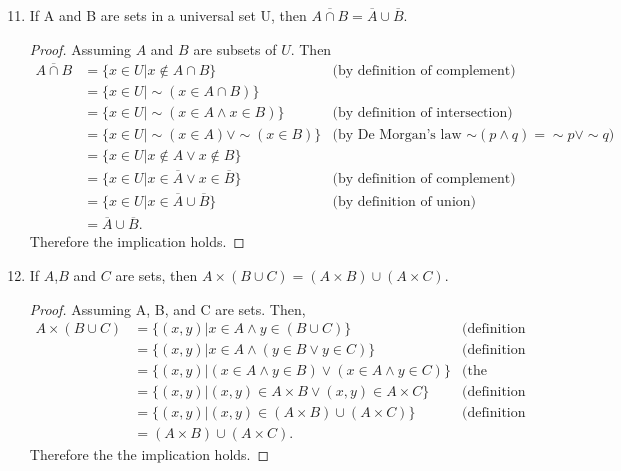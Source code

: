\documentclass{article}
\newcommand{\nitem}[1] %
{
	\setcounter{enumi}{#1}
	\addtocounter{enumi}{-1}
	\item
}
\begin{document}
\begin{enumerate}
		\nitem{10} If A and B are sets in a universal set U, then $\overline{A \cap B}= \overline{A} \cup \overline{B}$.
		\begin{proof} Assuming $A$ and $B$ are subsets of $U$. Then
			\begin{align*}
				\overline{A \cap B} &= \{x \in U| x \not\in A \cap B\} 
				& \text{(by definition of complement) } \\
				&= \{x \in U| \sim(x \in A \cap B)\} \\
				&= \{x \in U| \sim(x \in A \wedge x \in B)\} 
				& \text{(by definition of intersection)}\\
				&= \{x \in U| \sim(x \in A) \vee \sim(x \in B)\} 
				& \text{(by De Morgan's law $\sim(p \wedge q)= \sim p \vee \sim q$)} \\
				&= \{x \in U| x \not\in A \vee x \not\in B\}		\\
				&= \{x \in U| x \in \overline{A} \vee x \in \overline{B}\} 
				& \text{(by definition of complement) } \\
				&= \{x \in U| x \in \overline{A} \cup \overline{B}\} 
				& \text{(by definition of union)}\\
				&=\overline{A} \cup \overline{B}.
			\end{align*}
			Therefore the implication holds.  
		\end{proof}
		
		\nitem{16} If $A$,$B$ and $C$ are sets, then $A \times (B \cup C)= (A \times B) \cup (A \times C)$.
		\begin{proof}
			Assuming A, B, and C are sets. Then,
			\begin{align*}
				A \times (B \cup C) &= \{(x,y)| x \in A \wedge y \in (B \cup C)\} 		  & \text{(definition of Cartesian product)}\\
				&= \{(x,y)| x \in A \wedge (y \in B  \vee y \in  C)\} & \text{(definition of union)} \\
				&= \{(x,y)| (x \in A \wedge y \in B ) \vee(x \in A \wedge y \in  C)\}
				& \text{(the distributive property )}\\
				&= \{(x,y)| (x,y) \in A \times B  \vee (x,y) \in A \times C\} & \text{(definition of Cartesian product)}\\
				&= \{(x,y)| (x,y) \in (A \times B)  \cup (A \times C)\} & \text{(definition of union product)}\\
				&= (A \times B)  \cup (A \times C).
			\end{align*}
			Therefore the the implication holds.
		\end{proof}
		

\end{enumerate}
\end{document}
